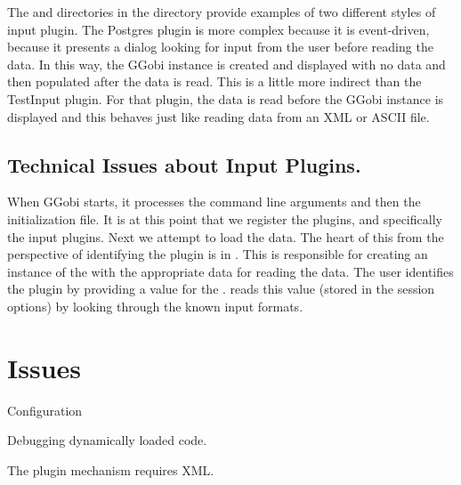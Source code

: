 \documentclass{article}
\begin{document}
The  and  directories in the
 directory provide examples of two different styles of
input plugin. The Postgres plugin is more complex because it is
event-driven, because it presents a dialog looking for input from the
user before reading the data.  In this way, the GGobi instance is
created and displayed with no data and then populated after the data
is read. This is a little more indirect than the TestInput plugin.
For that plugin, the data is read before the GGobi instance is
displayed and this behaves just like reading data from an XML or ASCII
file.


\subsection{Technical Issues about Input Plugins.}
When GGobi starts, it processes the command line arguments and then the
initialization file.  It is at this point that we register the
plugins, and specifically the input plugins.  Next we attempt to load
the data.  The heart of this from the perspective of identifying the
plugin is  in .  This is
responsible for creating an instance of the 
with the appropriate data for reading the data.  The user identifies
the plugin by providing a value for the .
 reads this value (stored in the session
options) by looking through the known input formats.




\section{Issues}
Configuration

Debugging dynamically loaded code.

The plugin mechanism requires XML.
\end{document}
